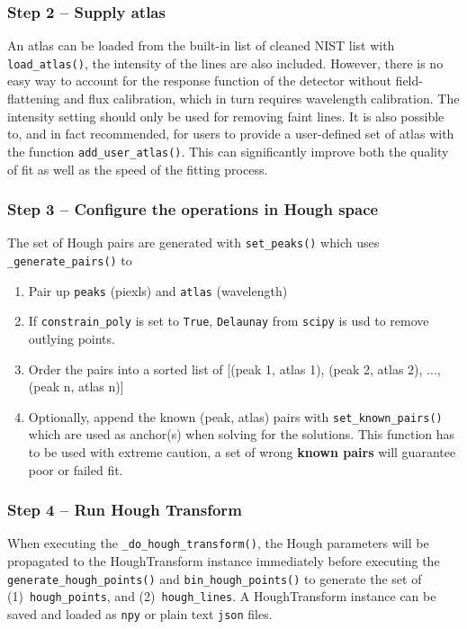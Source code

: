 \documentclass[fleqn,usenatbib]{rasti}
\begin{document}
\subsubsection*{Step 2 -- Supply atlas}
An atlas can be loaded from the built-in list of cleaned NIST list with
\texttt{load\_atlas()}, the intensity of the lines are also included.
However, there is no easy way to account for the response function of
the detector without field-flattening and flux calibration, which in turn
requires wavelength calibration. The intensity setting should only be
used for removing faint lines. It is also possible to, and in fact
recommended, for users to provide a user-defined set of atlas with the
function \texttt{add\_user\_atlas()}. This can significantly improve
both the quality of fit as well as the speed of the fitting process.

\subsubsection*{Step 3 -- Configure the operations in Hough space}
The set of Hough pairs are generated with \texttt{set\_peaks()} which uses
\texttt{\_generate\_pairs()} to
\begin{enumerate}
    \item Pair up \texttt{peaks} (piexls) and \texttt{atlas} (wavelength)
    \item If \texttt{constrain\_poly} is set to \texttt{True},
        \texttt{Delaunay} from \texttt{scipy} is usd to remove outlying points.
    \item Order the pairs into a sorted list of [(peak 1, atlas 1),
        (peak 2, atlas 2), ..., (peak n, atlas n)]
    \item Optionally, append the known (peak, atlas) pairs with
        \texttt{set\_known\_pairs()} which are used as anchor(s) when solving
            for the solutions. This function has to be used with extreme
            caution, a set of wrong \textbf{known pairs} will guarantee
            poor or failed fit.
\end{enumerate}

\subsubsection*{Step 4 -- Run Hough Transform}
When executing the \texttt{\_do\_hough\_transform()}, the Hough parameters
will be propagated to the HoughTransform instance immediately before
executing the \texttt{generate\_hough\_points()} and
\texttt{bin\_hough\_points()} to generate the set of 
(1)~\texttt{hough\_points}, and (2)~\texttt{hough\_lines}. A HoughTransform
instance can be saved and loaded as \texttt{npy} or plain text \texttt{json}
files.
\end{document}
